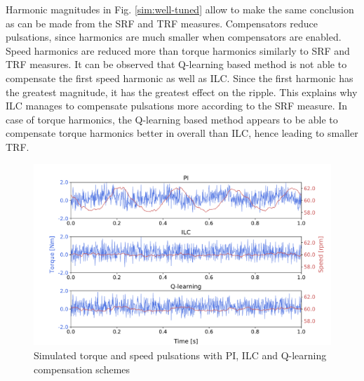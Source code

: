 Harmonic magnitudes in Fig. \ref{sim:well-tuned} allow to make the same conclusion as can be made from the SRF and TRF measures. Compensators reduce pulsations, since harmonics are much smaller when compensators are enabled. Speed harmonics are reduced more than torque harmonics similarly to SRF and TRF measures. It can be observed that Q-learning based method is not able to compensate the first speed harmonic as well as ILC. Since the first harmonic has the greatest magnitude, it has the greatest effect on the ripple. This explains why ILC manages to compensate pulsations more according to the SRF measure. In case of torque harmonics, the Q-learning based method appears to be able to compensate torque harmonics better in overall than ILC, hence leading to smaller TRF.
\begin{figure}[htb] 
    \centering
    \includegraphics[width=1.0\textwidth]{images/simulation-results-time.pdf}
    \caption{Simulated torque and speed pulsations with PI, ILC and Q-learning compensation schemes}
    \label{sim:results-time}
\end{figure}


